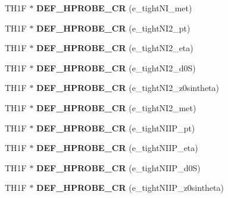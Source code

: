 \begin{DoxyCompactItemize}
\item 
\hypertarget{classHistos__Fake_a504d0e10f2c5368fc378e1c29d7bdd83}{
TH1F $\ast$ {\bfseries DEF\_\-HPROBE\_\-CR} (e\_\-tightNI\_\-met)}
\label{classHistos__Fake_a504d0e10f2c5368fc378e1c29d7bdd83}

\item 
\hypertarget{classHistos__Fake_ad0428255599c38f530c7930b6d37332e}{
TH1F $\ast$ {\bfseries DEF\_\-HPROBE\_\-CR} (e\_\-tightNI2\_\-pt)}
\label{classHistos__Fake_ad0428255599c38f530c7930b6d37332e}

\item 
\hypertarget{classHistos__Fake_a51b0a5f6e3eb0fd2ccc2c7646b702495}{
TH1F $\ast$ {\bfseries DEF\_\-HPROBE\_\-CR} (e\_\-tightNI2\_\-eta)}
\label{classHistos__Fake_a51b0a5f6e3eb0fd2ccc2c7646b702495}

\item 
\hypertarget{classHistos__Fake_aab97743ddea433767ea69c8fe19962a9}{
TH1F $\ast$ {\bfseries DEF\_\-HPROBE\_\-CR} (e\_\-tightNI2\_\-d0S)}
\label{classHistos__Fake_aab97743ddea433767ea69c8fe19962a9}

\item 
\hypertarget{classHistos__Fake_a8e4f929719d8033b5b8e91efd46bd6fd}{
TH1F $\ast$ {\bfseries DEF\_\-HPROBE\_\-CR} (e\_\-tightNI2\_\-z0sintheta)}
\label{classHistos__Fake_a8e4f929719d8033b5b8e91efd46bd6fd}

\item 
\hypertarget{classHistos__Fake_abae82c40bc11559f4152378545cf96a7}{
TH1F $\ast$ {\bfseries DEF\_\-HPROBE\_\-CR} (e\_\-tightNI2\_\-met)}
\label{classHistos__Fake_abae82c40bc11559f4152378545cf96a7}

\item 
\hypertarget{classHistos__Fake_a09cfe418fbd93efeff335c6be127a554}{
TH1F $\ast$ {\bfseries DEF\_\-HPROBE\_\-CR} (e\_\-tightNIIP\_\-pt)}
\label{classHistos__Fake_a09cfe418fbd93efeff335c6be127a554}

\item 
\hypertarget{classHistos__Fake_a0af73163da5ab8071efb30041d89aa34}{
TH1F $\ast$ {\bfseries DEF\_\-HPROBE\_\-CR} (e\_\-tightNIIP\_\-eta)}
\label{classHistos__Fake_a0af73163da5ab8071efb30041d89aa34}

\item 
\hypertarget{classHistos__Fake_a89cefabbd96e5907c47a624af7f8655a}{
TH1F $\ast$ {\bfseries DEF\_\-HPROBE\_\-CR} (e\_\-tightNIIP\_\-d0S)}
\label{classHistos__Fake_a89cefabbd96e5907c47a624af7f8655a}

\item 
\hypertarget{classHistos__Fake_ae70471ff03495ecc3cd6bb63e2953482}{
TH1F $\ast$ {\bfseries DEF\_\-HPROBE\_\-CR} (e\_\-tightNIIP\_\-z0sintheta)}
\label{classHistos__Fake_ae70471ff03495ecc3cd6bb63e2953482}


\end{DoxyCompactItemize}
